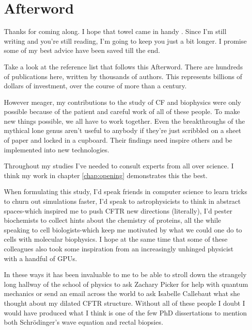 \chapter{Afterword}
\label{chap:Afterword}

Thanks for coming along. I hope that towel came in handy \cite{adamd1979}. Since I'm still writing and you're still reading, I'm going to keep you just a bit longer. I promise some of my best advice have been saved till the end. 

Take a look at the reference list that follows this Afterword. There are hundreds of publications here, written by thousands of authors. This represents billions of dollars of investment, over the course of more than a century. 

However meager, my contributions to the study of CF and biophysics were only possible because of the patient and careful work of all of these people. To make new things possible, we all have to work together. Even the breakthroughs of the mythical lone genus aren't useful to anybody if they're just scribbled on a sheet of paper and locked in a cupboard. Their findings need inspire others and be implemented into new technologies.

Throughout my studies I've needed to consult experts from all over science. I think my work in chapter \ref{chap:opening} demonstrates this the best. 

When formulating this study, I'd speak friends in computer science to learn tricks to churn out simulations faster, I'd speak to astrophysicists to think in abstract spaces-which inspired me to push CFTR new directions (literally), I'd pester biochemists to collect hints about the chemistry of proteins, all the while speaking to cell biologists-which keep me motivated by what we could one do to cells with molecular biophysics. I hope at the same time that some of these colleagues also took some inspiration from an increasingly unhinged physicist with a handful of GPUs. 

In these ways it has been invaluable to me to be able to stroll down the strangely long hallway of the school of physics to ask Zachary Picker for help with quantum mechanics or send an email across the world to ask Isabelle Callebaut what she thought about my dilated CFTR structure. Without all of these people I doubt I would have produced what I think is one of the few PhD dissertations to mention both Schr\"odinger's wave equation and rectal biopsies. 


